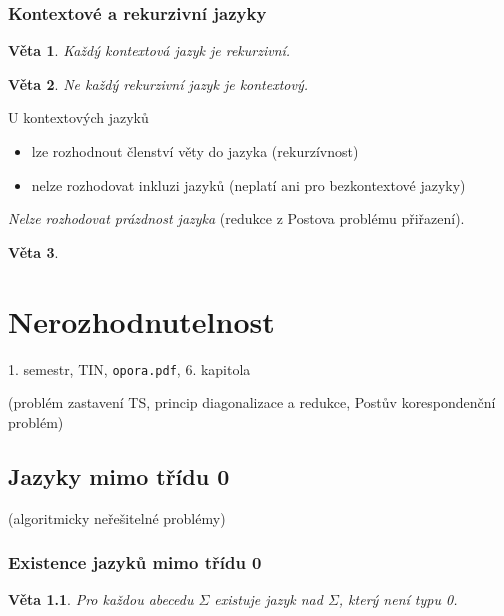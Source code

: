 \documentclass[a4paper, 11pt]{report}
\newtheorem{veta}{Věta}[chapter]
\begin{document}
\subsection{Kontextové a rekurzivní jazyky}
\begin{veta}
Každý kontextová jazyk je rekurzivní.
\end{veta}

\begin{veta}
\emph{Ne} každý rekurzivní jazyk je kontextový.
\end{veta}

U kontextových jazyků
\begin{itemize}
	\item lze rozhodnout členství věty do jazyka (rekurzívnost)
	\item nelze rozhodovat inkluzi jazyků (neplatí ani pro bezkontextové jazyky)
\end{itemize}
\emph{Nelze rozhodovat prázdnost jazyka} (redukce z Postova problému přiřazení).
\begin{veta}
\end{veta}


\chapter{Nerozhodnutelnost} \label{cha:23}
1. semestr, TIN, \texttt{opora.pdf}, 6. kapitola

(problém zastavení TS, princip diagonalizace a redukce, Postův korespondenční problém)

\section{Jazyky mimo třídu 0}
(algoritmicky neřešitelné problémy)

\subsection{Existence jazyků mimo třídu 0}
\begin{veta}
Pro každou abecedu $\Sigma$ existuje jazyk nad $\Sigma$, který není typu 0.
\end{veta}
\end{document}
